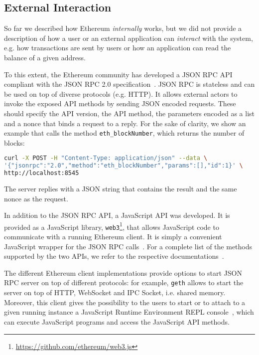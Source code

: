 \subsection{External Interaction}

So far we described how Ethereum \emph{internally} works, but we did not provide
a description of how a user or an external application can \emph{interact} with
the system, e.g. how transactions are sent by users or how an application can
read the balance of a given address.

To this extent, the Ethereum community has developed a JSON RPC
API~\cite{bib:json-rpc} compliant with the JSON RPC 2.0
specification~\cite{bib:json2012json}. JSON RPC is stateless and can be used on
top of diverse protocols (e.g. HTTP). It allows external actors to invoke the
exposed API methods by sending JSON encoded requests. These should specify the
API version, the API method, the parameters encoded as a list and a nonce that
binds a request to a reply. For the sake of clarity, we show an example that
calls the method \verb|eth_blockNumber|, which returns the number of blocks:

\begin{lstlisting}[language=bash]
curl -X POST -H "Content-Type: application/json" --data \
'{"jsonrpc":"2.0","method":"eth_blockNumber","params":[],"id":1}' \
http://localhost:8545
\end{lstlisting}

The server replies with a JSON string that contains the result and the same
nonce as the request.

In addition to the JSON RPC API, a JavaScript API was developed. It is provided
as a JavaScript library,
\texttt{web3}\footnote{\url{https://github.com/ethereum/web3.js}}, that allows
JavaScript code to communicate with a running Ethereum client. It is simply a
convenient JavaScript wrapper for the JSON RPC calls~\cite{bib:javascript-api}.
For a complete list of the methods supported by the two APIs, we refer to the
respective documentations~\cite{bib:json-rpc, bib:javascript-api}.

The different Ethereum client implementations provide options to start JSON RPC
server on top of different protocols: for example, \texttt{geth} allows to start
the server on top of HTTP, WebSocket and IPC Socket, i.e. shared memory.
Moreover, this client gives the possibility to the users to start or to attach
to a given running instance a JavaScript Runtime Environment REPL
console~\cite{bib:js-console}, which can execute JavaScript programs and access
the JavaScript API methods.
